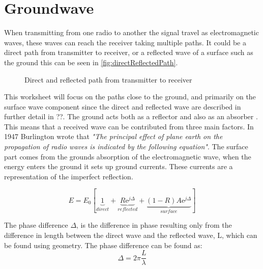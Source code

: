 \chapter{Groundwave}

When transmitting from one radio to another the signal travel as electromagnetic waves, these waves can reach the receiver taking multiple paths. It could be a direct path from transmitter to receiver, or a reflected wave of a surface such as the ground this can be seen in \autoref{fig:directReflectedPath}. 

\begin{figure}[H]
\centering

\caption{Direct and reflected path from transmitter to receiver}
\label{fig:directReflectedPath}
\end{figure}

This worksheet will focus on the paths close to the ground, and primarily on the surface wave component since the direct and reflected wave are described in further detail in ??. The ground acts both as a reflector and also as an absorber \citep{Bullington}. This means that a received wave can be contributed from three main factors. In 1947 Burlington wrote that \textit{"The principal effect of plane earth on the propagation of radio waves is indicated by the following equation"}\citep{Bullington}. The surface part comes from the grounds absorption of the electromagnetic wave, when the energy enters the ground it sets up ground currents. These currents are a representation of the imperfect reflection.    

\begin{equation}
E=E_0\left[\underbrace{1}_{direct}+\underbrace{R\text{e}^{j\Delta}}_{reflected}+\underbrace{(1-R)A\text{e}^{j\Delta}}_{surface}\right]
\end{equation}
\begin{where}
\end{where}

The phase difference $\Delta$, is the difference in phase resulting only from the difference in length between the direct wave and the reflected wave, L, which can be found using geometry. The phase difference can be found as:
\begin{equation}
\Delta =2\pi \frac{L}{\lambda}
\end{equation}
\begin{where}
\end{where}

